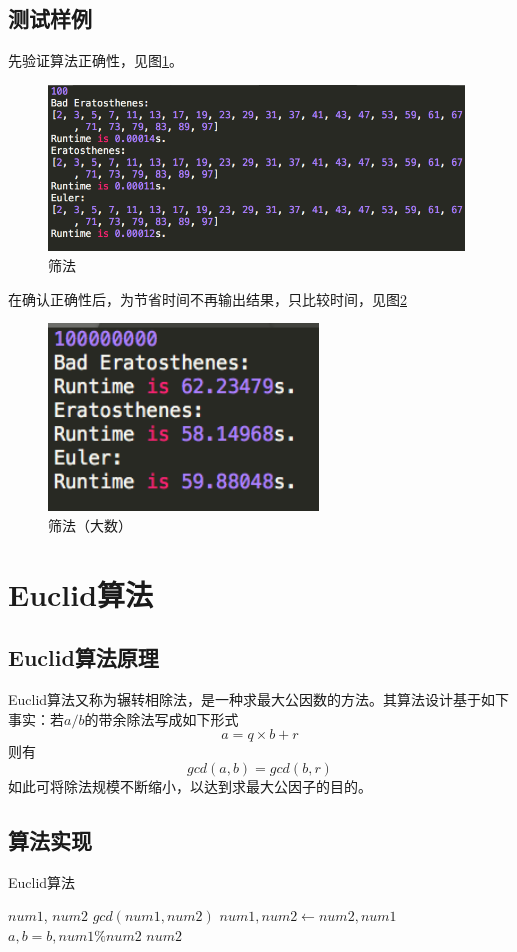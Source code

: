 \documentclass[11pt]{ctexart}
\begin{document}
\subsection{测试样例}
先验证算法正确性，见图\ref{img_sieve1}。
\begin{figure}[htbp]
\centering
\includegraphics[height=4.41cm,width=11.02cm]{sieve_small.png}
\caption{筛法}
\label{img_sieve1}
\end{figure}
在确认正确性后，为节省时间不再输出结果，只比较时间，见图\ref{img_Sieve2}
\begin{figure}[htbp]
\centering
\includegraphics[height=4.98cm,width=7.17cm]{Sieve_big.png}
\caption{筛法（大数）}
\label{img_Sieve2}
\end{figure}

\section{Euclid算法}

\subsection{Euclid算法原理}
Euclid算法又称为辗转相除法，是一种求最大公因数的方法。其算法设计基于如下事实：若$a/b$的带余除法写成如下形式
$$a = q \times b + r$$
则有
$$gcd(a,b) = gcd(b,r)$$
如此可将除法规模不断缩小，以达到求最大公因子的目的。
\newpage{}
\subsection{算法实现}
\begin{algorithm}  
    \caption{Euclid算法}  
    \begin{algorithmic}[1] %
        \Require $num1$, $num2$ 
        \Ensure $gcd(num1,num2)$  
                \State $num1, num2 \gets num2, num1$
            \EndIf
                \State $a, b = b, num1 \% num2$
            \EndWhile
            \State \Return $num2$
        \EndFunction  
    \end{algorithmic}  
\end{algorithm} 
\end{document}
